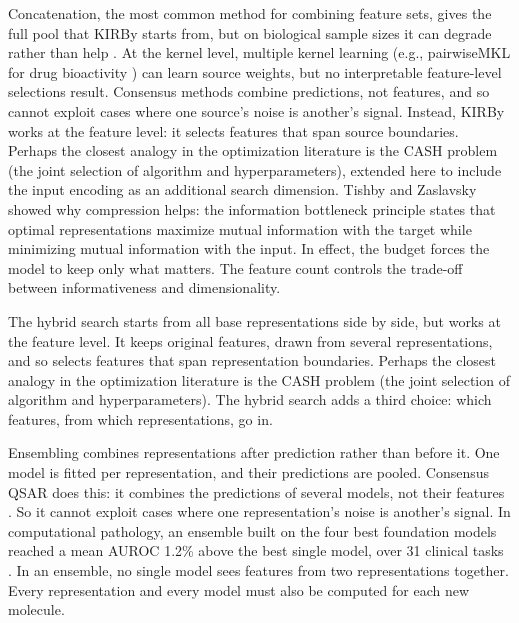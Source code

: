 Concatenation, the most common method for combining feature sets, gives the full pool that KIRBy starts from, but on biological sample sizes it can degrade rather than help \citep{Bellman1961, Stahlschmidt2022}. At the kernel level, multiple kernel learning \citep{Gonen2011} (e.g., pairwiseMKL for drug bioactivity \citep{Cichonska2018}) can learn source weights, but no interpretable feature-level selections result. Consensus methods \citep{Valsecchi2020} combine predictions, not features, and so cannot exploit cases where one source's noise is another's signal. Instead, KIRBy works at the feature level: it selects features that span source boundaries. Perhaps the closest analogy in the optimization literature is the CASH problem \citep{Thornton2013} (the joint selection of algorithm and hyperparameters), extended here to include the input encoding as an additional search dimension. Tishby and Zaslavsky \citep{Tishby2015} showed why compression helps: the information bottleneck principle states that optimal representations maximize mutual information with the target while minimizing mutual information with the input. In effect, the budget forces the model to keep only what matters. The feature count controls the trade-off between informativeness and dimensionality.

The hybrid search starts from all base representations side by side, but works at the feature level. It keeps original features, drawn from several representations, and so selects features that span representation boundaries. Perhaps the closest analogy in the optimization literature is the CASH problem \citep{Thornton2013} (the joint selection of algorithm and hyperparameters). The hybrid search adds a third choice: which features, from which representations, go in.





Ensembling combines representations after prediction rather than before it. One model is fitted per representation, and their predictions are pooled. Consensus QSAR does this: it combines the predictions of several models, not their features \citep{Valsecchi2020}. So it cannot exploit cases where one representation's noise is another's signal. In computational pathology, an ensemble built on the four best foundation models reached a mean AUROC 1.2\% above the best single model, over 31 clinical tasks \citep{ElNahhas2025}. In an ensemble, no single model sees features from two representations together. Every representation and every model must also be computed for each new molecule.

